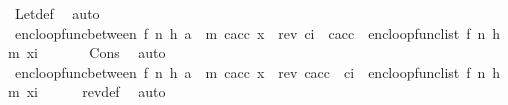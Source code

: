 \begin{isabellebody}
\ Let{\isacharunderscore}{\kern0pt}def\ \isamarkupfalse%
\ auto\isanewline
\ \ \isamarkupfalse%
\ {\isachardoublequoteopen}enc{\isacharunderscore}{\kern0pt}loop{\isacharunderscore}{\kern0pt}func{\isacharunderscore}{\kern0pt}between\ {\isacharparenleft}{\kern0pt}f{\isacharcomma}{\kern0pt}\ n{\isacharcomma}{\kern0pt}\ h{\isacharcomma}{\kern0pt}\ a\ {\isacharhash}{\kern0pt}\ m{\isacharparenright}{\kern0pt}\ c{\isacharunderscore}{\kern0pt}acc\ x\ {\isacharequal}{\kern0pt}\ rev\ {\isacharparenleft}{\kern0pt}{\isacharquery}{\kern0pt}c{\isacharunderscore}{\kern0pt}i\ {\isacharhash}{\kern0pt}\ c{\isacharunderscore}{\kern0pt}acc{\isacharparenright}{\kern0pt}\ {\isacharat}{\kern0pt}\ enc{\isacharunderscore}{\kern0pt}loop{\isacharunderscore}{\kern0pt}func{\isacharunderscore}{\kern0pt}list\ {\isacharparenleft}{\kern0pt}f{\isacharcomma}{\kern0pt}\ n{\isacharcomma}{\kern0pt}\ h{\isacharcomma}{\kern0pt}\ m{\isacharparenright}{\kern0pt}\ {\isacharquery}{\kern0pt}x{\isacharunderscore}{\kern0pt}i{\isachardoublequoteclose}\ \isanewline
\ \ \ \ \isamarkupfalse%
\ Cons\ \isamarkupfalse%
\ auto\isanewline
\ \ \isamarkupfalse%
\ {\isachardoublequoteopen}enc{\isacharunderscore}{\kern0pt}loop{\isacharunderscore}{\kern0pt}func{\isacharunderscore}{\kern0pt}between\ {\isacharparenleft}{\kern0pt}f{\isacharcomma}{\kern0pt}\ n{\isacharcomma}{\kern0pt}\ h{\isacharcomma}{\kern0pt}\ a\ {\isacharhash}{\kern0pt}\ m{\isacharparenright}{\kern0pt}\ c{\isacharunderscore}{\kern0pt}acc\ x\ {\isacharequal}{\kern0pt}\ rev\ c{\isacharunderscore}{\kern0pt}acc\ {\isacharat}{\kern0pt}\ {\isacharbrackleft}{\kern0pt}{\isacharquery}{\kern0pt}c{\isacharunderscore}{\kern0pt}i{\isacharbrackright}{\kern0pt}\ {\isacharat}{\kern0pt}\ enc{\isacharunderscore}{\kern0pt}loop{\isacharunderscore}{\kern0pt}func{\isacharunderscore}{\kern0pt}list\ {\isacharparenleft}{\kern0pt}f{\isacharcomma}{\kern0pt}\ n{\isacharcomma}{\kern0pt}\ h{\isacharcomma}{\kern0pt}\ m{\isacharparenright}{\kern0pt}\ {\isacharquery}{\kern0pt}x{\isacharunderscore}{\kern0pt}i{\isachardoublequoteclose}\isanewline
\ \ \ \ \isamarkupfalse%
\ rev{\isacharunderscore}{\kern0pt}def\ \isamarkupfalse%
\ auto\isanewline
\ \ \isamarkupfalse%

\end{isabellebody}

